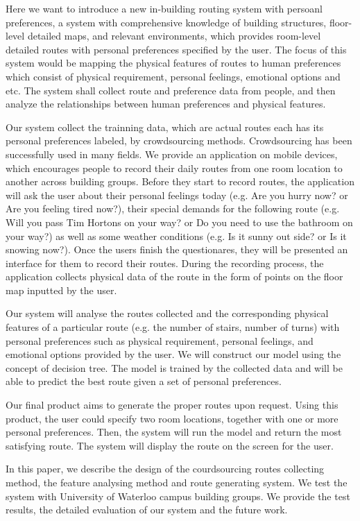 \documentclass{sigchi}
\begin{document}
Here we want to introduce a new in-building routing system with persoanl preferences, a system with comprehensive knowledge of building structures, floor-level detailed maps, and relevant environments, which provides room-level detailed routes with personal preferences specified by the user. The focus of this system would be mapping the physical features of routes to human preferences which consist of physical requirement, personal feelings, emotional options and etc. The system shall collect route and preference data from people, and then analyze the relationships between human preferences and physical features.


Our system collect the trainning data, which are actual routes each has its personal preferences labeled, by crowdsourcing methods. Crowdsourcing has been successfully used in many fields. We provide an application on mobile devices, which encourages people to record their daily routes from one room location to another across building groups. Before they start to record routes, the application will ask the user about their personal feelings today (e.g. Are you hurry now? or Are you feeling tired now?), their special demands for the following route (e.g. Will you pass Tim Hortons on your way? or Do you need to use the bathroom on your way?) as well as some weather conditions (e.g. Is it sunny out side? or Is it snowing now?). Once the users finish the questionares, they will be presented an interface for them to record their routes. During the recording process, the application collects physical data of the route in the form of points on the floor map inputted by the user. 


Our system will analyse the routes collected and the corresponding physical features of a particular route (e.g. the number of stairs, number of turns) with personal preferences such as physical requirement, personal feelings, and emotional options provided by the user. We will construct our model using the concept of decision tree. The model is trained by the collected data and will be able to predict the best route given a set of personal preferences.


Our final product aims to generate the proper routes upon request. Using this product, the user could specify two room locations, together with one or more personal preferences. Then, the system will run the model and return the most satisfying route. The system will display the route on the screen for the user. 


In this paper, we describe the design of the courdsourcing routes collecting method, the feature analysing method and route generating system. We test the system with University of Waterloo campus building groups. We provide the test results, the detailed evaluation of our system and the future work.
\end{document}
